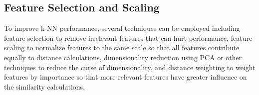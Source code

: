 \subsection{Feature Selection and Scaling}

To improve k-NN performance, several techniques can be employed including feature selection to remove irrelevant features that can hurt performance, feature scaling to normalize features to the same scale so that all features contribute equally to distance calculations, dimensionality reduction using PCA or other techniques to reduce the curse of dimensionality, and distance weighting to weight features by importance so that more relevant features have greater influence on the similarity calculations.

